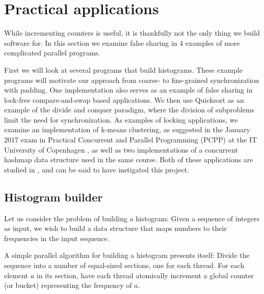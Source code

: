 


\section{Practical applications}
While incrementing counters is useful, it is thankfully not the only thing we
build software for.
In this section we examine false sharing in 4 examples of more complicated
parallel programs.

First we will look at several programs that build histograms. These example
programs will motivate our approach from coarse- to fine-grained synchronization
with padding. One implementation also serves as an example of false sharing in
lock-free compare-and-swap based applications. We then use Quicksort as an example of the
divide and conquer paradigm, where the division of subproblems limit the need
for synchronization.
As examples of locking applications, we examine an implementation of k-means
clustering, as suggested in the January 2017 exam in Practical Concurrent and
Parallel Programming (PCPP) at the IT University of Copenhagen \cite{kmeansexam,
kmeansexamcode}, as well as two implementations of a concurrent hashmap data structure
used in the same course. Both of these applications are studied in
\cite{mystery}, and can be said to have instigated this project.

\subsection{Histogram builder}

Let us consider the problem of building a histogram: Given a sequence of
integers as input, we wish to build a data structure that maps numbers to their
frequencies in the input sequence.

A simple parallel algorithm for building a histogram presents itself: Divide the
sequence into a number of equal-sized sections, one for each thread. For each
element $a$ in its section, have each thread atomically increment a global
counter (or bucket) representing the frequency of $a$.

